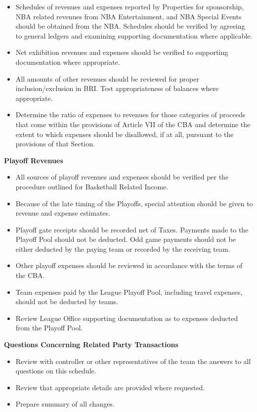 \documentclass[
]{book}
\providecommand{\tightlist}{%
  \setlength{\itemsep}{0pt}\setlength{\parskip}{0pt}}
\begin{document}
\begin{itemize}
\item
  Schedules of revenues and expenses reported by Properties for sponsorship, NBA related revenues from NBA Entertainment, and NBA Special Events should be obtained from the NBA. Schedules should be verified by agreeing to general ledgers and examining supporting documentation where applicable.
\item
  Net exhibition revenues and expenses should be verified to supporting documentation where appropriate.
\item
  All amounts of other revenues should be reviewed for proper inclusion/exclusion in BRI. Test appropriateness of balances where appropriate.
\item
  Determine the ratio of expenses to revenues for those categories of proceeds that come within the provisions of Article VII of the CBA and determine the extent to which expenses should be disallowed, if at all, pursuant to the provisions of that Section.
\end{itemize}

\textbf{Playoff Revenues}

\begin{itemize}
\tightlist
\item
  All sources of playoff revenues and expenses should be verified per the procedure outlined for Basketball Related Income.
\item
  Because of the late timing of the Playoffs, special attention should be given to revenue and expense estimates.
\item
  Playoff gate receipts should be recorded net of Taxes. Payments made to the Playoff Pool should not be deducted. Odd game payments should not be either deducted by the paying team or recorded by the receiving team.
\item
  Other playoff expenses should be reviewed in accordance with the terms of the CBA.
\item
  Team expenses paid by the League Playoff Pool, including travel expenses, should not be deducted by teams.
\item
  Review League Office supporting documentation as to expenses deducted from the Playoff Pool.
\end{itemize}

\textbf{Questions Concerning Related Party Transactions}

\begin{itemize}
\tightlist
\item
  Review with controller or other representatives of the team the answers to all questions on this schedule.
\item
  Review that appropriate details are provided where requested.
\item
  Prepare summary of all changes.
\end{itemize}
\end{document}
